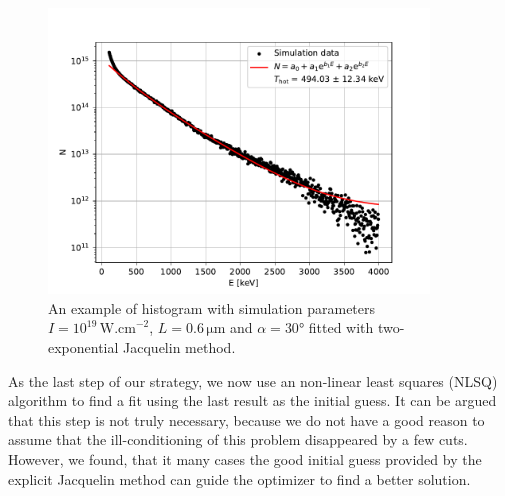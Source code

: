 \begin{figure}[t]
	\centering
	\includegraphics[width=0.9\textwidth]{figures/hist_1e19_060_30_2exp}
	\caption{An example of histogram with simulation parameters $I=10^{19}\,\mathrm{W.cm}^{-2}$, $L=0.6\,\mathrm{\mu m}$ and $\alpha = 30$° fitted with two-exponential Jacquelin method.}
	\label{fig:2exp-fit-example}
\end{figure}

As the last step of our strategy, we now use an non-linear least squares (NLSQ) algorithm to find a fit using the last result as the initial guess. It can be argued that this step is not truly necessary, because we do not have a good reason to assume that the ill-conditioning of this problem disappeared by a few cuts. However, we found, that it many cases the good initial guess provided by the explicit Jacquelin method can guide the optimizer to find a better solution. 


